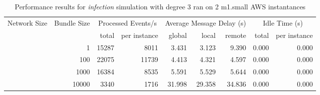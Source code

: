 \begin{table}
	  \caption[Performance results, \emph{infection:3 on 2 m1.small instances }]{ Performance results for \emph{ infection } simulation with degree 3 ran on 2 m1.small AWS instantances }
	\begin{tabular}{rrrrrrrrr}
	\hline\noalign{\smallskip}

	Network Size &
	Bundle Size &
	\multicolumn{2}{c}{Processed Events/s} & 
	\multicolumn{3}{c}{Average Message Delay (s)} & 
	\multicolumn{2}{c}{Idle Time (s)}  \\

	 & 
	 & 
	 total & per instance
     & global & local & remote
     & total & per instance\\

			
				\noalign{\smallskip}\hline
				\multirow{ 4 }{*}{ 40000 } &
				
					
					 
					\multirow{ 1 }{*}{ 1 } &
					
						
							    
							     15287  & 8011  
	                           & 3.431 & 3.123 & 9.390
	                           & 0.000 & 0.000  \\
	                
	            
					 &  
					 
					\multirow{ 1 }{*}{ 100 } &
					
						
							    
							     22075  & 11739  
	                           & 4.413 & 4.321 & 4.597
	                           & 0.000 & 0.000  \\
	                
	            
					 &  
					 
					\multirow{ 1 }{*}{ 1000 } &
					
						
							    
							     16384  & 8535  
	                           & 5.591 & 5.529 & 5.644
	                           & 0.000 & 0.000  \\
	                
	            
					 &  
					 
					\multirow{ 1 }{*}{ 10000 } &
					
						
							    
							     3340  & 1716  
	                           & 31.998 & 29.358 & 34.836
	                           & 0.000 & 0.000  \\
	                

\end{tabular}
\end{table}
